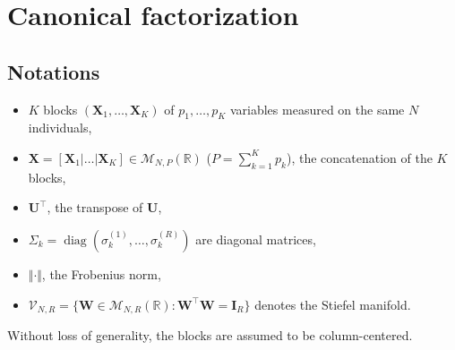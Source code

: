 \documentclass[11pt]{article}
\DeclareMathOperator{\diag}{diag}
\newcommand{\W}{\mathbf{W}}
\newcommand{\I}{\mathbf{I}}
\newcommand{\Stiefel}[2]{\mathcal V_{#1,#2}}
\begin{document}

\section{Canonical factorization}
\subsection*{Notations}

\begin{itemize}
 
	\item $K$ blocks $(\textbf{X}_1,\ldots,\textbf{X}_K)$ of $p_1,\ldots,p_K$ variables measured on the same $N$ individuals,
\item $\textbf{X}=[\textbf{X}_1|\ldots|\textbf{X}_K]\in \mathcal M_{N,P}(\mathbb R)$ ($P=\sum_{k=1}^K p_k$), the concatenation of the $K$ blocks,
\item $\textbf{U}^\intercal$, the transpose of $\textbf{U}$,
	\item $\Sigma_k=\diag(\sigma_k^{(1)},\ldots,\sigma_k^{(R)})$ are diagonal matrices,
	\item $\Vert \cdot \Vert$, the Frobenius norm,
	\item $\Stiefel{N}{R}=\{\W\in\mathcal M_{N,R}(\mathbb R):\W^\intercal\W=\I_R\}$
denotes the Stiefel manifold.
\end{itemize}
 
Without loss of generality, the blocks are assumed to be column-centered.
\end{document}
